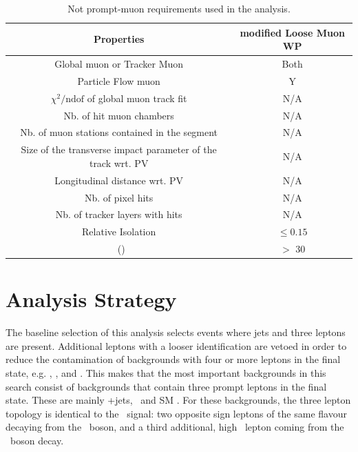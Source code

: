 \begin{table}[htbp]
	\centering
	\caption{Not prompt-muon requirements used in the analysis. }
	
	\begin{tabular}{cc}
		\toprule
	 Properties	& modified Loose Muon WP \\ 
		\midrule 
		Global muon or Tracker Muon & Both  \\ 
		
		Particle Flow muon & Y  \\ 
		
		$\chi^2/\mathrm{ndof}$ of global muon track fit & N/A \\  
		
		Nb. of hit muon chambers & N/A \\ 
		 
		Nb. of muon stations contained in the segment & N/A   \\ 
		
		Size of the transverse impact parameter  of the track wrt. PV & N/A  \\ 
		 
		Longitudinal distance wrt. PV & N/A \\ 
		
		Nb. of pixel hits & N/A \\ 
		
		Nb. of tracker layers with hits & N/A  \\ 
		
		Relative Isolation & $\leq 0.15$ \\
		
		\pt\ (\GeV) &$>$ 30  \\
		\bottomrule
	\end{tabular} 
	
	\label{tab:nonpromptmu}
\end{table}


\newpage
\section{Analysis Strategy}
\label{sec:regions}

The baseline selection of this analysis selects events where jets and three leptons are present. Additional leptons with a looser identification are vetoed in order to reduce the contamination of backgrounds with four or more leptons in the final state, e.g. \ZZ, \ttZ, and \ttH. This makes that the most important backgrounds in this search consist of backgrounds  that contain three prompt leptons in the final state. These are mainly \WZ +jets, \ttZ\ and SM \tZq. For these backgrounds, the three lepton topology is identical to the \FCNC\ signal: two opposite sign leptons of the same flavour decaying from the \PZ\ boson, and a third additional, high \pt\ lepton coming from the \PW\ boson decay.

